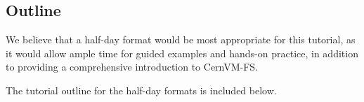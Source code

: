 \subsection*{Outline}

We believe that a half-day format would be most appropriate for this tutorial, as it would allow ample time for guided
examples and hands-on practice, in addition to providing a comprehensive introduction to CernVM-FS.

The tutorial outline for the half-day formats is included below.

% 

